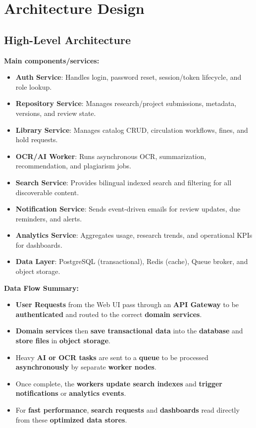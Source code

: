 \documentclass[12pt,a4paper]{article}
\begin{document}
\section{Architecture Design}
\subsection{High-Level Architecture}
\textbf{Main components/services:}
\begin{itemize}
    \item \textbf{Auth Service}: Handles login, password reset, session/token lifecycle, and role lookup.
    \item \textbf{Repository Service}: Manages research/project submissions, metadata, versions, and review state.
    \item \textbf{Library Service}: Manages catalog CRUD, circulation workflows, fines, and hold requests.
    \item \textbf{OCR/AI Worker}: Runs asynchronous OCR, summarization, recommendation, and plagiarism jobs.
    \item \textbf{Search Service}: Provides bilingual indexed search and filtering for all discoverable content.
    \item \textbf{Notification Service}: Sends event-driven emails for review updates, due reminders, and alerts.
    \item \textbf{Analytics Service}: Aggregates usage, research trends, and operational KPIs for dashboards.
    \item \textbf{Data Layer}: PostgreSQL (transactional), Redis (cache), Queue broker, and object storage.
\end{itemize}

\textbf{Data Flow Summary:}
\begin{itemize}
\item \textbf{User Requests} from the Web UI pass through an \textbf{API Gateway} to be \textbf{authenticated} and routed to the correct \textbf{domain services}.
\item \textbf{Domain services} then \textbf{save transactional data} into the \textbf{database} and \textbf{store files} in \textbf{object storage}.
\item Heavy \textbf{AI or OCR tasks} are sent to a \textbf{queue} to be processed \textbf{asynchronously} by separate \textbf{worker nodes}.
\item Once complete, the \textbf{workers update search indexes} and \textbf{trigger notifications} or \textbf{analytics events}.
\item For \textbf{fast performance}, \textbf{search requests} and \textbf{dashboards} read directly from these \textbf{optimized data stores}.
\end{itemize}
\end{document}

